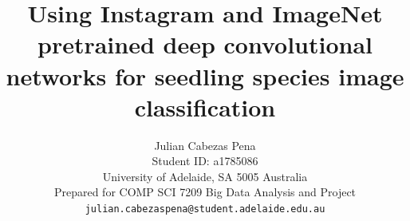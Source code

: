 \documentclass[10pt,onecolumn,titlepage,letterpaper]{article}
\begin{document}
\title{Using Instagram and ImageNet pretrained deep convolutional networks for seedling species image classification}

\author{Julian Cabezas Pena\\
Student ID: a1785086\\
University of Adelaide, SA 5005 Australia\\
Prepared for COMP SCI 7209 Big Data Analysis and Project \\
{\tt\small julian.cabezaspena@student.adelaide.edu.au}
}

\maketitle
\end{document}
